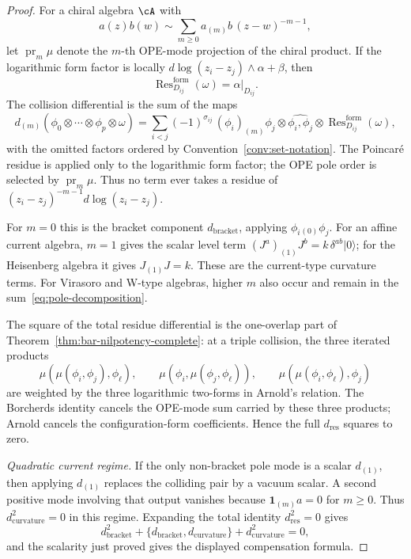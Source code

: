 \begin{proof}
For a chiral algebra $\cA$ with
\[
a(z)b(w)\sim\sum_{m\ge0} a_{(m)}b\,(z-w)^{-m-1},
\]
let $\operatorname{pr}_m\mu$ denote the $m$-th OPE-mode projection of
the chiral product. If the logarithmic form factor is locally
$d\log(z_i-z_j)\wedge\alpha+\beta$, then
\[
\operatorname{Res}_{D_{ij}}^{\mathrm{form}}(\omega)=\alpha|_{D_{ij}}.
\]
The collision differential is the sum of the maps
\[
d_{(m)}
(\phi_0\otimes\cdots\otimes\phi_p\otimes\omega)
=
\sum_{i<j}(-1)^{\sigma_{ij}}\,
(\phi_i)_{(m)}\phi_j\otimes
\widehat{\phi_i,\phi_j}\otimes
\operatorname{Res}_{D_{ij}}^{\mathrm{form}}(\omega),
\]
with the omitted factors ordered by Convention~\ref{conv:set-notation}.
The Poincar\'e residue is applied only to the logarithmic form factor;
the OPE pole order is selected by $\operatorname{pr}_m\mu$. Thus no
term ever takes a residue of
$(z_i-z_j)^{-m-1}d\log(z_i-z_j)$.

For $m=0$ this is the bracket component
$d_{\mathrm{bracket}}$, applying
$\phi_i{}_{(0)}\phi_j$. For an affine current algebra,
$m=1$ gives the scalar level term
$(J^a)_{(1)}J^b=k\,\delta^{ab}|0\rangle$; for the Heisenberg algebra
it gives $J_{(1)}J=k$. These are the current-type curvature terms.
For Virasoro and W-type algebras, higher $m$ also occur and remain in
the sum~\eqref{eq:pole-decomposition}.

The square of the total residue differential is the one-overlap part
of Theorem~\ref{thm:bar-nilpotency-complete}: at a triple collision,
the three iterated products
\[
\mu(\mu(\phi_i,\phi_j),\phi_\ell),\qquad
\mu(\phi_i,\mu(\phi_j,\phi_\ell)),\qquad
\mu(\mu(\phi_i,\phi_\ell),\phi_j)
\]
are weighted by the three logarithmic two-forms in Arnold's relation.
The Borcherds identity cancels the OPE-mode sum carried by these
three products; Arnold cancels the configuration-form coefficients.
Hence the full $d_{\mathrm{res}}$ squares to zero.

\emph{Quadratic current regime.}
If the only non-bracket pole mode is a scalar $d_{(1)}$, then applying
$d_{(1)}$ replaces the colliding pair by a vacuum scalar. A second
positive mode involving that output vanishes because
$\mathbf{1}_{(m)}a=0$ for $m\ge0$. Thus
$d_{\mathrm{curvature}}^2=0$ in this regime. Expanding the total identity
$d_{\mathrm{res}}^2=0$ gives
\begin{equation}\label{eq:borcherds-pole-mix}
d_{\mathrm{bracket}}^2
+\{d_{\mathrm{bracket}},d_{\mathrm{curvature}}\}
+d_{\mathrm{curvature}}^2=0,
\end{equation}
and the scalarity just proved gives the displayed compensation formula.
\end{proof}

